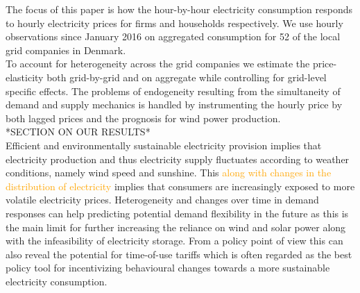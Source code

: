 \label{sec:intro}
The focus of this paper is how the hour-by-hour electricity consumption responds to hourly electricity prices for firms and households respectively. We use hourly observations since January 2016 on aggregated consumption for 52 of the local grid companies in Denmark.
\medskip\\

To account for heterogeneity across the grid companies we estimate the price-elasticity both grid-by-grid and on aggregate while controlling for grid-level specific effects. The problems of endogeneity resulting from the simultaneity of demand and supply mechanics is handled by instrumenting the hourly price by both lagged prices and the prognosis for wind power production.
\medskip\\

*SECTION ON OUR RESULTS* 
\medskip\\

Efficient and environmentally sustainable electricity provision implies that electricity production and thus electricity supply fluctuates according to weather conditions, namely wind speed and sunshine. This \textcolor{orange}{along with changes in the distribution of electricity} 
implies that consumers are increasingly exposed to more volatile electricity prices. Heterogeneity and changes over time in demand responses can help predicting potential demand flexibility in the future as this is the main limit for further increasing the reliance on wind and solar power along with the infeasibility of electricity storage. From a policy point of view this can also reveal the potential for time-of-use tariffs which is often regarded as the best policy tool for incentivizing behavioural changes towards a more sustainable electricity consumption.